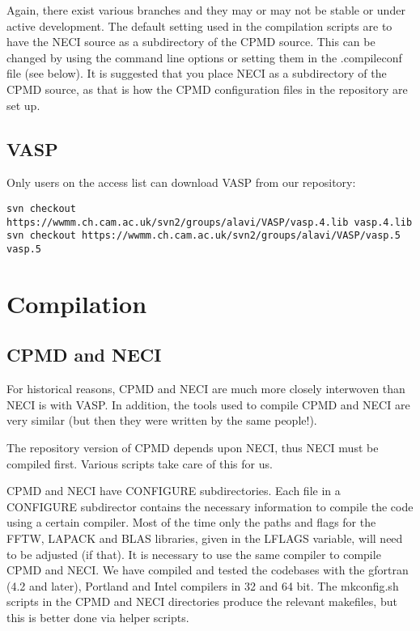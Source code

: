 \documentclass[openany,a4paper,10pt,english]{manual}
\begin{document}
Again, there exist various branches and they may or may not be stable
or under active development.
The default setting used in the compilation scripts are to have the NECI source as
a subdirectory of the CPMD source.  This can be changed by using the
command line options or setting them in the .compileconf file (see below).
It is suggested that you place NECI as a subdirectory of the CPMD source,
as that is how the CPMD configuration files in the repository are set up.


\subsection{VASP}

Only users on the access list can download VASP from our repository:

\begin{Verbatim}[commandchars=@\[\]]
svn checkout https://wwmm.ch.cam.ac.uk/svn2/groups/alavi/VASP/vasp.4.lib vasp.4.lib
svn checkout https://wwmm.ch.cam.ac.uk/svn2/groups/alavi/VASP/vasp.5 vasp.5
\end{Verbatim}


\section{Compilation}


\subsection{CPMD and NECI}

For historical reasons, CPMD and NECI are much more closely interwoven
than NECI is with VASP.  In addition, the tools used to compile CPMD and
NECI are very similar (but then they were written by the same people!).

The repository version of CPMD depends upon NECI, thus NECI must be
compiled first.  Various scripts take care of this for us.

CPMD and NECI have CONFIGURE subdirectories.  Each file in a CONFIGURE
subdirector contains the necessary information to compile the code using
a certain compiler.  Most of the time only the paths and flags for the
FFTW, LAPACK and BLAS libraries, given in the LFLAGS variable, will need
to be adjusted (if that).  It is necessary to use the same compiler to
compile CPMD and NECI.  We have compiled and tested the codebases with the
gfortran (4.2 and later), Portland and Intel compilers in 32 and 64 bit.
The mkconfig.sh scripts in the CPMD and NECI directories produce the
relevant makefiles, but this is better done via helper scripts.
\end{document}

